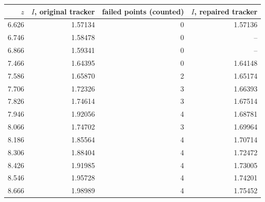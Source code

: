 \begin{tabular}{rrrr}
\toprule
$z$ & $I$, original tracker & failed points (counted) & $I$, repaired tracker\\
\midrule
6.626 & 1.57134 & 0 & 1.57136\\
6.746 & 1.58478 & 0 & --\\
6.866 & 1.59341 & 0 & --\\
7.466 & 1.64395 & 0 & 1.64148\\
7.586 & 1.65870 & 2 & 1.65174\\
7.706 & 1.72326 & 3 & 1.66393\\
7.826 & 1.74614 & 3 & 1.67514\\
7.946 & 1.92056 & 4 & 1.68781\\
8.066 & 1.74702 & 3 & 1.69964\\
8.186 & 1.85564 & 4 & 1.70714\\
8.306 & 1.88404 & 4 & 1.72472\\
8.426 & 1.91985 & 4 & 1.73005\\
8.546 & 1.95728 & 4 & 1.74201\\
8.666 & 1.98989 & 4 & 1.75452\\
\bottomrule
\end{tabular}
